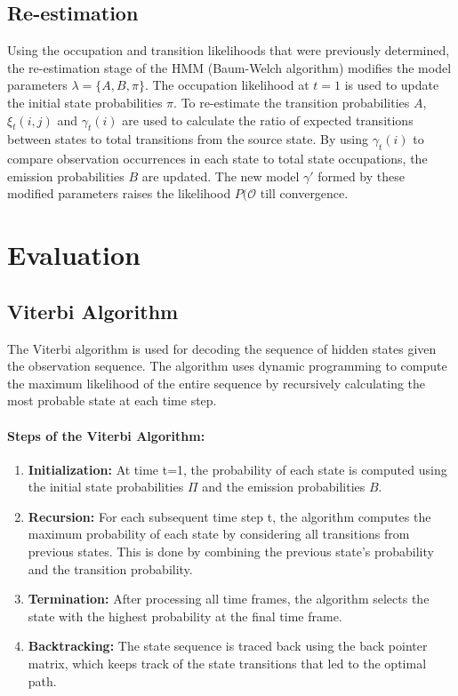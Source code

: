 \documentclass{article}
\begin{document}
\subsection{Re-estimation}

Using the occupation and transition likelihoods that were previously determined, the re-estimation stage of the HMM (Baum-Welch algorithm) modifies the model parameters $\lambda = \{A, B, \pi\}$. The occupation likelihood at $t = 1$ is used to update the initial state probabilities $\pi$. To re-estimate the transition probabilities $A$, $\xi_t(i,j)$ and $\gamma_t(i)$ are used to calculate the ratio of expected transitions between states to total transitions from the source state. By using $\gamma_t(i)$ to compare observation occurrences in each state to total state occupations, the emission probabilities $B$ are updated. The new model $\gamma'$ formed by these modified parameters raises the likelihood $P(\mathcal{O}$ till convergence.






\section{Evaluation}

\subsection{Viterbi Algorithm}
The Viterbi algorithm is used for decoding the sequence of hidden states given the observation sequence. The algorithm uses dynamic programming to compute the maximum likelihood of the entire sequence by recursively calculating the most probable state at each time step.

\paragraph{Steps of the Viterbi Algorithm:}
\begin{enumerate}
\item \textbf{Initialization:} At time t=1, the probability of each state is computed using the initial state probabilities $\Pi$ and the emission probabilities $B$.
\item \textbf{Recursion:} For each subsequent time step t, the algorithm computes the maximum probability of each state by considering all transitions from previous states. This is done by combining the previous state’s probability and the transition probability.
\item \textbf{Termination:} After processing all time frames, the algorithm selects the state with the highest probability at the final time frame.
\item \textbf{Backtracking:} The state sequence is traced back using the back pointer matrix, which keeps track of the state transitions that led to the optimal path.
\end{enumerate}
\end{document}
